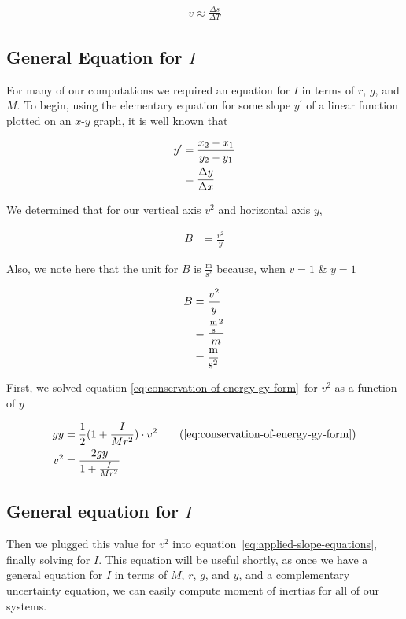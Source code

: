 \documentclass[coverpage]{article}
\newcommand{\mpssq}{\frac{\text{m}}{\text{s}^2}}
\begin{document}
	\begin{align}
		v \approx \frac{\Delta{s}}{\Delta{T}} \label{eq:delta-s-delta-t}
	\end{align}

	\subsection{General Equation for $I$}
	
	For many of our computations we required an equation for $I$ in terms of $r$, $g$, and $M$. To begin, using the elementary equation for some slope $y^\prime$ of a linear function plotted on an $x$-$y$ graph, it is well known that
	
	\begin{align}
		y^\prime &= \frac{x_2 - x_1}{y_2 - y_1} \notag \\
		&= \frac{\Delta{y}}{\Delta{x}}
	\end{align}
	
	We determined that for our vertical axis $v^2$ and horizontal axis $y$,
	
	\begin{align}
		B &= \frac{v^2}{y} \label{eq:applied-slope-equations}
	\end{align}
	
	Also, we note here that the unit for $B$ is $\mpssq$ because, when $v=1$ \& $y=1$
	
	\begin{align}
		B &= \frac{v^2}{y} \notag \\
		&= \frac{\frac{\text{m}}{\text{s}}^2}{m} \notag \\
		&= \mpssq
	\end{align}
	
	First, we solved equation \ref{eq:conservation-of-energy-gy-form}~for $v^2$ as a function of $y$
	
	\begin{align}
		gy &= \frac{1}{2}(1 + \frac{I}{Mr^2}) \cdot v^2 \tag{\ref{eq:conservation-of-energy-gy-form}} \\
		v^2 &= \frac{2gy}{1 + \frac{I}{Mr^2}}
	\end{align}
	
	\subsection{General equation for $I$}
	
	Then we plugged this value for $v^2$ into equation~\ref{eq:applied-slope-equations}, finally solving for $I$. This equation will be useful shortly, as once we have a general equation for $I$ in terms of $M$, $r$, $g$, and $y$, and a complementary uncertainty equation, we can easily compute moment of inertias for all of our systems.
	
\end{document}
